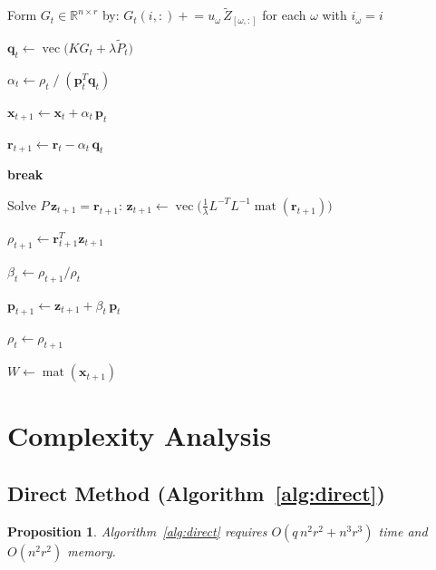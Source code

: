 \documentclass[12pt]{article}
\newtheorem{proposition}[theorem]{Proposition}
\theoremstyle{definition}
\DeclareMathOperator{\vecop}{vec}
\DeclareMathOperator{\mat}{mat}
\newcommand{\R}{\mathbb{R}}
\newcommand{\bz}{\mathbf{z}}
\newcommand{\bp}{\mathbf{p}}
\newcommand{\bq}{\mathbf{q}}
\newcommand{\br}{\mathbf{r}}
\begin{document}
\begin{algorithm}[H]
\begin{algorithmic}[1]
  \State Form $G_t\in\R^{n\times r}$ by:
         $G_t(i,:)\mathrel{+}= u_\omega\,\widetilde{Z}_{[\omega,:]}$
         for each $\omega$ with $i_\omega=i$

  \State $\bq_t \gets \vecop\!\bigl(K G_t + \lambda\widetilde{P}_t\bigr)$

  \medskip
  \State $\alpha_t \gets \rho_t\;/\;(\bp_t^T\bq_t)$

  \State $\mathbf{x}_{t+1} \gets \mathbf{x}_t + \alpha_t\,\bp_t$

  \State $\br_{t+1} \gets \br_t - \alpha_t\,\bq_t$

  \If{$\|\br_{t+1}\|_2 \leq \varepsilon\,\|\mathbf{b}\|_2$}
    \State \textbf{break}
  \EndIf

  \State Solve $P\,\bz_{t+1} = \br_{t+1}$:
         $\bz_{t+1} \gets \vecop\!\bigl(\tfrac{1}{\lambda}L^{-T}L^{-1}\mat(\br_{t+1})\bigr)$

  \State $\rho_{t+1} \gets \br_{t+1}^T\bz_{t+1}$

  \State $\beta_t \gets \rho_{t+1}/\rho_t$

  \State $\bp_{t+1} \gets \bz_{t+1} + \beta_t\,\bp_t$

  \State $\rho_t \gets \rho_{t+1}$

\EndFor

\State \Return $W \gets \mat(\mathbf{x}_{t+1})$
\end{algorithmic}
\end{algorithm}

\section{Complexity Analysis}

\subsection{Direct Method (Algorithm~\ref{alg:direct})}

\begin{proposition}\label{prop:direct-complexity}
  Algorithm~\ref{alg:direct} requires
  $O(q\,n^2r^2 + n^3r^3)$ time and $O(n^2r^2)$ memory.
\end{proposition}
\end{document}
